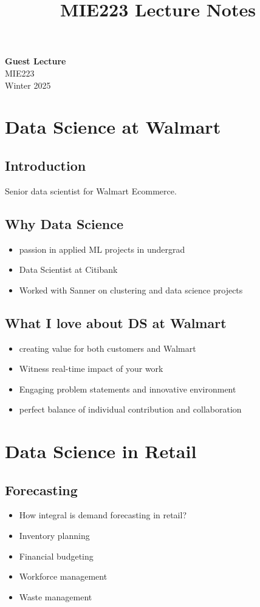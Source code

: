 \documentclass[11pt]{article}
\theoremstyle{definition}
\begin{document}
\setcounter{section}{0}
\title{MIE223 Lecture Notes}

\thispagestyle{empty}

\begin{center}
{\LARGE \bf Guest Lecture}\\
{\large MIE223}\\
Winter 2025
\end{center}
\section{Data Science at Walmart}
\subsection{Introduction}
Senior data scientist for Walmart Ecommerce.

\subsection{Why Data Science}
\begin{itemize}
    \item passion in applied ML projects in undergrad
    \item Data Scientist at Citibank
    \item Worked with Sanner on clustering and data science projects
\end{itemize}

\subsection{What I love about DS at Walmart}
\begin{itemize}
    \item creating value for both customers and Walmart
    \item Witness real-time impact of your work
    \item Engaging problem statements and innovative environment
    \item perfect balance of individual contribution and collaboration
\end{itemize}

\section{Data Science in Retail}
\subsection{Forecasting}
\begin{itemize}
    \item How integral is demand forecasting in retail?
    \item Inventory planning
    \item Financial budgeting
    \item Workforce management
    \item Waste management
\end{itemize}
\end{document}
